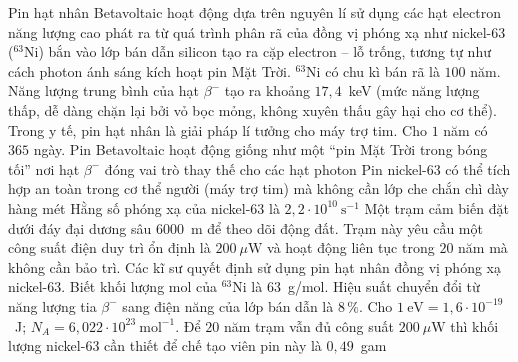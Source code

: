 	\begin{ex}%
		Pin hạt nhân Betavoltaic hoạt động dựa trên nguyên lí sử dụng các hạt electron năng lượng cao phát ra từ quá trình phân rã của đồng vị phóng xạ như nickel-63 (${}^{63}\text{Ni}$) bắn vào lớp bán dẫn silicon tạo ra cặp electron -- lỗ trống, tương tự như cách photon ánh sáng kích hoạt pin Mặt Trời. ${}^{63}\text{Ni}$ có chu kì bán rã là $100$ năm. Năng lượng trung bình của hạt $\beta^{-}$ tạo ra khoảng $17{,}4$~keV (mức năng lượng thấp, dễ dàng chặn lại bởi vỏ bọc mỏng, không xuyên thấu gây hại cho cơ thể). Trong y tế, pin hạt nhân là giải pháp lí tưởng cho máy trợ tim. Cho $1$ năm có $365$ ngày.
		\choiceTFt
		{\True Pin Betavoltaic hoạt động giống như một ``pin Mặt Trời trong bóng tối'' nơi hạt $\beta^{-}$ đóng vai trò thay thế cho các hạt photon}
		{\True Pin nickel-63 có thể tích hợp an toàn trong cơ thể người (máy trợ tim) mà không cần lớp che chắn chì dày hàng mét}
		{Hằng số phóng xạ của nickel-63 là $2{,}2\cdot 10^{10}~\text{s}^{-1}$}
		{\True Một trạm cảm biến đặt dưới đáy đại dương sâu $6000$~m để theo dõi động đất. Trạm này yêu cầu một công suất điện duy trì ổn định là $200~\mu\text{W}$ và hoạt động liên tục trong $20$ năm mà không cần bảo trì. Các kĩ sư quyết định sử dụng pin hạt nhân đồng vị phóng xạ nickel-63. Biết khối lượng mol của ${}^{63}\text{Ni}$ là $63$~g/mol. Hiệu suất chuyển đổi từ năng lượng tia $\beta^{-}$ sang điện năng của lớp bán dẫn là $8\,\%$. Cho $1~\text{eV}=1{,}6\cdot 10^{-19}$~J; $N_A=6{,}022\cdot 10^{23}~\text{mol}^{-1}$. Để $20$ năm trạm vẫn đủ công suất $200~\mu\text{W}$ thì khối lượng nickel-63 cần thiết để chế tạo viên pin này là $0{,}49$~gam}
	\end{ex}

